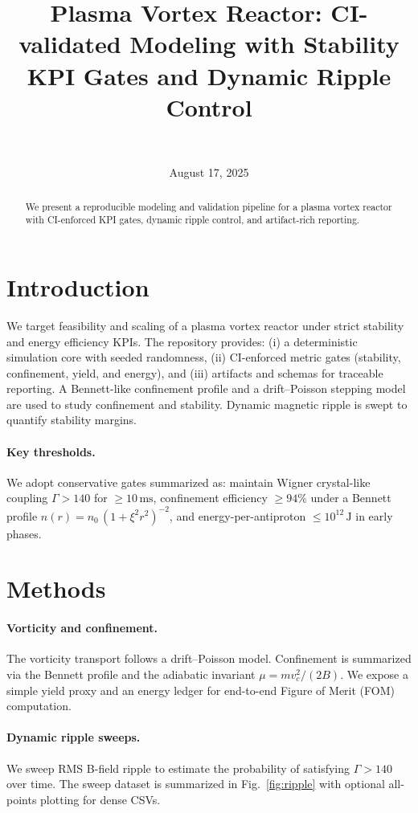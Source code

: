 \documentclass[11pt]{article}
\title{Plasma Vortex Reactor: CI-validated Modeling with Stability KPI Gates and Dynamic Ripple Control}
\author{\authorname\\\texttt{\authoremail}}
\date{August 17, 2025}
\begin{document}
\maketitle
\begin{abstract}
We present a reproducible modeling and validation pipeline for a plasma vortex reactor with CI-enforced KPI gates, dynamic ripple control, and artifact-rich reporting.
\end{abstract}
\section{Introduction}
We target feasibility and scaling of a plasma vortex reactor under strict stability and energy efficiency KPIs. The repository provides: (i) a deterministic simulation core with seeded randomness, (ii) CI-enforced metric gates (stability, confinement, yield, and energy), and (iii) artifacts and schemas for traceable reporting. A Bennett-like confinement profile and a drift--Poisson stepping model are used to study confinement and stability. Dynamic magnetic ripple is swept to quantify stability margins.

\paragraph{Key thresholds.} We adopt conservative gates summarized as: maintain Wigner crystal-like coupling $\Gamma>140$ for $\ge 10\,\mathrm{ms}$, confinement efficiency $\ge 94\%$ under a Bennett profile $n(r)=n_0\,(1+\xi^2 r^2)^{-2}$, and energy-per-antiproton $\le 10^{12}\,\mathrm{J}$ in early phases.

\section{Methods}
\paragraph{Vorticity and confinement.} The vorticity transport follows a drift--Poisson model. Confinement is summarized via the Bennett profile and the adiabatic invariant $\mu = m v_c^2/(2B)$. We expose a simple yield proxy and an energy ledger for end-to-end Figure of Merit (FOM) computation.

\paragraph{Dynamic ripple sweeps.} We sweep RMS B-field ripple to estimate the probability of satisfying $\Gamma>140$ over time. The sweep dataset is summarized in Fig.~\ref{fig:ripple} with optional all-points plotting for dense CSVs.
\end{document}
